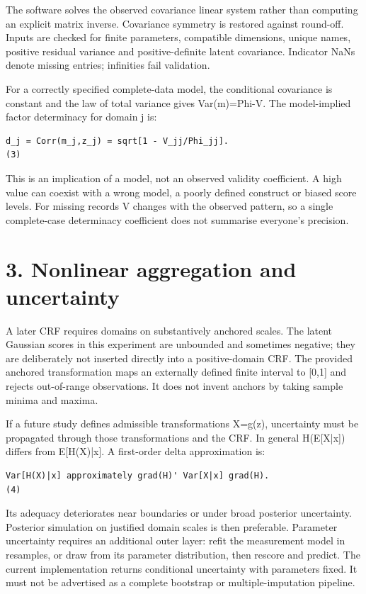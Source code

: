 \documentclass[11pt,a4paper]{article}
\begin{document}
The software solves the observed covariance linear system rather than computing an explicit matrix inverse. Covariance symmetry is restored against round-off. Inputs are checked for finite parameters, compatible dimensions, unique names, positive residual variance and positive-definite latent covariance. Indicator NaNs denote missing entries; infinities fail validation.

For a correctly specified complete-data model, the conditional covariance is constant and the law of total variance gives Var(m)=Phi-V. The model-implied factor determinacy for domain j is:

{\footnotesize\begin{verbatim}
d_j = Corr(m_j,z_j) = sqrt[1 - V_jj/Phi_jj].                           (3)
\end{verbatim}}
This is an implication of a model, not an observed validity coefficient. A high value can coexist with a wrong model, a poorly defined construct or biased score levels. For missing records V changes with the observed pattern, so a single complete-case determinacy coefficient does not summarise everyone's precision.

\section*{3. Nonlinear aggregation and uncertainty}
A later CRF requires domains on substantively anchored scales. The latent Gaussian scores in this experiment are unbounded and sometimes negative; they are deliberately not inserted directly into a positive-domain CRF. The provided anchored transformation maps an externally defined finite interval to [0,1] and rejects out-of-range observations. It does not invent anchors by taking sample minima and maxima.

If a future study defines admissible transformations X=g(z), uncertainty must be propagated through those transformations and the CRF. In general H(E[X|x]) differs from E[H(X)|x]. A first-order delta approximation is:

{\footnotesize\begin{verbatim}
Var[H(X)|x] approximately grad(H)' Var[X|x] grad(H).                   (4)
\end{verbatim}}
Its adequacy deteriorates near boundaries or under broad posterior uncertainty. Posterior simulation on justified domain scales is then preferable. Parameter uncertainty requires an additional outer layer: refit the measurement model in resamples, or draw from its parameter distribution, then rescore and predict. The current implementation returns conditional uncertainty with parameters fixed. It must not be advertised as a complete bootstrap or multiple-imputation pipeline.
\end{document}
